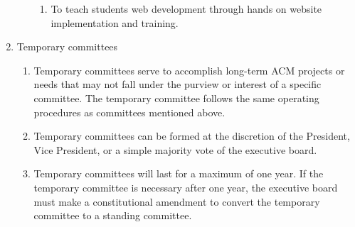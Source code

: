 \begin{enumerate}[label=\Alph*.]
\begin{enumerate}
        \begin{enumerate}
          \item To teach students web development through hands on website
            implementation and training.
        \end{enumerate}
      \end{enumerate}
  \item Temporary committees
    \begin{enumerate}
      \item Temporary committees serve to accomplish long-term ACM projects or
        needs that may not fall under the purview or interest of a specific
        committee. The temporary committee follows the same operating procedures
        as committees mentioned above.
      \item Temporary committees can be formed at the discretion of the
        President, Vice President, or a simple majority vote of the executive
        board.
      \item Temporary committees will last for a maximum of one year. If the
        temporary committee is necessary after one year, the executive board
        must make a constitutional amendment to convert the temporary committee
        to a standing committee.
    \end{enumerate}
\end{enumerate}
